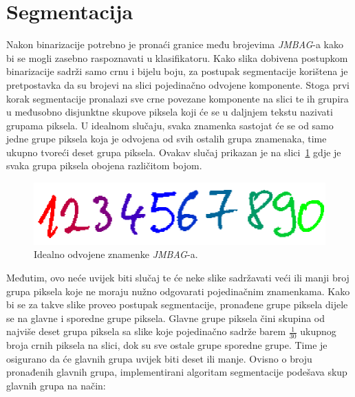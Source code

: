 \section{Segmentacija}
\label{sec:segmentacija}
Nakon binarizacije potrebno je pronaći granice među brojevima \emph{JMBAG}-a kako bi se mogli zasebno raspoznavati u
klasifikatoru. Kako slika dobivena postupkom binarizacije sadrži samo crnu i bijelu boju, za postupak segmentacije
korištena je pretpostavka da su brojevi na slici pojedinačno odvojene komponente. Stoga prvi korak segmentacije
pronalazi sve crne povezane komponente na slici te ih grupira u međusobno disjunktne skupove piksela koji će se u
daljnjem tekstu nazivati grupama piksela. U idealnom slučaju, svaka znamenka sastojat će se od samo jedne grupe piksela
koja je odvojena od svih ostalih grupa znamenaka, time ukupno tvoreći deset grupa piksela. Ovakav slučaj prikazan je na
slici\ \ref{fig:ideal-segmentation} gdje je svaka grupa piksela obojena različitom bojom.
\begin{figure}[htb]
    \centering
    \includegraphics[width=12cm]{images/chapter4/ideal-segmentation.png}
    \caption{Idealno odvojene znamenke \emph{JMBAG}-a.}
    \label{fig:ideal-segmentation}
\end{figure}
\newline
Međutim, ovo neće uvijek biti slučaj te će neke slike sadržavati veći ili manji broj grupa piksela koje ne moraju nužno
odgovarati pojedinačnim znamenkama. Kako bi se za takve slike proveo postupak segmentacije, pronađene grupe piksela
dijele se na glavne i sporedne grupe piksela. Glavne grupe piksela čini skupina od najviše deset grupa piksela sa slike
koje pojedinačno sadrže barem $\frac{1}{30}$ ukupnog broja crnih piksela na slici, dok su sve ostale grupe sporedne
grupe. Time je osigurano da će glavnih grupa uvijek biti deset ili manje. Ovisno o broju pronađenih glavnih grupa,
implementirani algoritam segmentacije podešava skup glavnih grupa na način:
